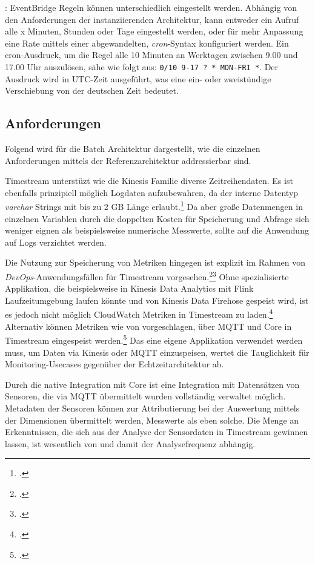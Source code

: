 : EventBridge Regeln können unterschiedlich eingestellt werden. Abhängig von den Anforderungen der instanziierenden Architektur, kann entweder ein Aufruf alle x Minuten, Stunden oder Tage eingestellt werden, oder für mehr Anpassung eine Rate mittels einer abgewandelten, \textit{cron}-Syntax konfiguriert werden. Ein cron-Ausdruck, um die Regel alle 10 Minuten an Werktagen zwischen 9.00 und 17.00 Uhr auszulösen, sähe wie folgt aus: \texttt{0/10 9-17 ? * MON-FRI *}. Der Ausdruck wird in \ac{UTC}-Zeit ausgeführt, was eine ein- oder zweistündige Verschiebung von der deutschen Zeit bedeutet.


\subsection{Anforderungen}
Folgend wird für die Batch Architektur dargestellt, wie die einzelnen Anforderungen mittels der Referenzarchitektur addressierbar sind.

Timestream unterstüzt wie die Kinesis Familie diverse Zeitreihendaten. Es ist ebenfalls prinzipiell möglich Logdaten aufzubewahren, da der interne Datentyp \textit{varchar} Strings mit bis zu 2 GB Länge erlaubt.\footcite[Vgl.][]{AmazonWebServicesInc..o.J.br} Da aber große Datenmengen in einzelnen Variablen durch die doppelten Kosten für Speicherung und Abfrage sich weniger eignen als beispielsweise numerische Messwerte, sollte auf die Anwendung auf Logs verzichtet werden.

Die Nutzung zur Speicherung von Metriken hingegen ist explizit im Rahmen von \textit{DevOps}-Anwendungsfällen für Timestream vorgesehen.\footcite[Vgl.][]{AmazonWebServicesInc..o.J.ak}\nzitat\footcite[Vgl.][]{Das.2020} Ohne spezialisierte Applikation, die beispielsweise in Kinesis Data Analytics mit Flink Laufzeitumgebung laufen könnte und von Kinesis Data Firehose gespeist wird, ist es jedoch nicht möglich CloudWatch Metriken in Timestream zu laden.\footcite[Vgl.][]{Riddle.2021} Alternativ können Metriken wie von \citeauthor{Pochiraju.2020} vorgeschlagen, über \ac{MQTT} und \AWSIOT{} Core in Timestream eingespeist werden.\footcite[Vgl.][]{Pochiraju.2020} Das eine eigene Applikation verwendet werden muss, um Daten via Kinesis oder \ac{MQTT} einzuspeisen, wertet die Tauglichkeit für Monitoring-Usecases gegenüber der Echtzeitarchitektur ab.


Durch die native Integration mit \AWSIOT{} Core ist eine Integration mit Datensätzen von Sensoren, die via \ac{MQTT} übermittelt wurden vollständig verwaltet möglich. Metadaten der Sensoren können zur Attributierung bei der Auswertung mittels der Dimensionen übermittelt werden, Messwerte als eben solche. Die Menge an Erkenntnissen, die sich aus der Analyse der Sensordaten in Timestream gewinnen lassen, ist wesentlich von  und damit der Analysefrequenz abhängig.


